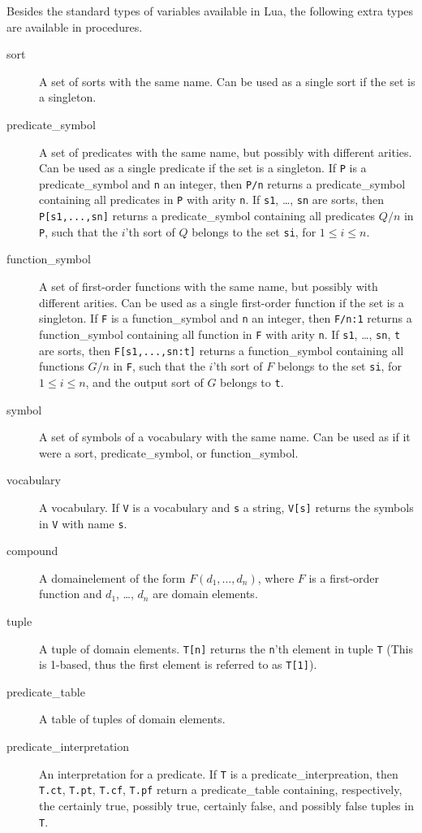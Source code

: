 Besides the standard types of variables available in Lua, the following extra types are available in \idp procedures.
\begin{description}
	\item[sort] A set of sorts with the same name. Can be used as a single sort if the set is a singleton.
	\item[predicate\_symbol] A set of predicates with the same name, but possibly with different arities. Can be used as a single predicate if the set is a singleton. If {\tt P} is a predicate\_symbol and {\tt n} an integer, then {\tt P/n} returns a predicate\_symbol containing all predicates in {\tt P} with arity {\tt n}. If {\tt s1}, \ldots, {\tt sn} are sorts, then {\tt P[s1,...,sn]} returns a predicate\_symbol containing all predicates $Q/n$ in {\tt P}, such that the $i$'th sort of $Q$ belongs to the set {\tt si}, for $1 \leq i \leq n$.
	\item[function\_symbol] A set of first-order functions with the same name, but possibly with different arities. Can be used as a single first-order function if the set is a singleton. If {\tt F} is a function\_symbol and {\tt n} an integer, then {\tt F/n:1} returns a function\_symbol containing all function in {\tt F} with arity {\tt n}. If {\tt s1}, \ldots, {\tt sn}, {\tt t} are sorts, then {\tt F[s1,...,sn:t]} returns a function\_symbol containing all functions $G/n$ in {\tt F}, such that the $i$'th sort of $F$ belongs to the set {\tt si}, for $1 \leq i \leq n$, and the output sort of $G$ belongs to {\tt t}.
	\item[symbol] A set of symbols of a vocabulary with the same name. Can be used as if it were a sort, predicate\_symbol, or function\_symbol.
	\item[vocabulary] A vocabulary. If {\tt V} is a vocabulary and {\tt s} a string, {\tt V[s]} returns the symbols in {\tt V} with name {\tt s}. 
	\item[compound] A domainelement of the form $F(d_1,\ldots,d_n)$, where $F$ is a first-order function and $d_1$, \ldots, $d_n$ are domain elements.
	\item[tuple] A tuple of domain elements. {\tt T[n]} returns the {\tt n}'th element in tuple {\tt T} (This is 1-based, thus the first element is referred to as {\tt T[1]}).
	\item[predicate\_table] A table of tuples of domain elements.
	\item[predicate\_interpretation] An interpretation for a predicate. If {\tt T} is a predicate\_interpreation, then {\tt T.ct}, {\tt T.pt}, {\tt T.cf}, {\tt T.pf} return a predicate\_table containing, respectively, the certainly true, possibly true, certainly false, and possibly false tuples in {\tt T}. %

\end{description}
